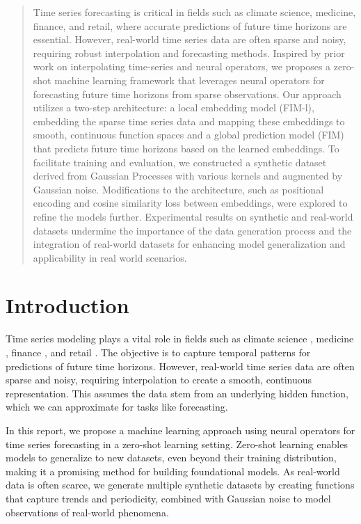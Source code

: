 \documentclass{article}
\theoremstyle{plain}
\theoremstyle{definition}
\theoremstyle{remark}
\begin{document}
\begin{abstract}
Time series forecasting is critical in fields such as climate science, medicine, finance, and retail, where accurate predictions of future time horizons are essential.
However, real-world time series data are often sparse and noisy, requiring robust interpolation and forecasting methods.
Inspired by prior work on interpolating time-series and neural operators, we proposes a zero-shot machine learning framework that leverages neural operators for forecasting future time horizons from sparse observations.
Our approach utilizes a two-step architecture: a local embedding model (FIM-l), embedding the sparse time series data and mapping these embeddings to smooth, continuous function spaces
and a global prediction model (FIM) that predicts future time horizons based on the learned embeddings.
To facilitate training and evaluation, we constructed a synthetic dataset derived from Gaussian Processes with various kernels and augmented by Gaussian noise.
Modifications to the architecture, such as positional encoding and cosine similarity loss between embeddings, were explored to refine the models further.
Experimental results on synthetic and real-world datasets undermine the importance of the data generation process and the integration of real-world datasets for enhancing model generalization and applicability in real world scenarios.
\end{abstract}

\section{Introduction}

Time series modeling plays a vital role in fields such as climate science \cite{climate}, medicine \cite{medicine}, finance \cite{finance}, and retail \cite{retail}. The objective is to capture temporal patterns for predictions of future time horizons. However, real-world time series data are often sparse and noisy, requiring interpolation to create a smooth, continuous representation. This assumes the data stem from an underlying hidden function, which we can approximate for tasks like forecasting.

In this report, we propose a machine learning approach using neural operators for time series forecasting in a zero-shot learning setting.
Zero-shot learning enables models to generalize to new datasets, even beyond their training distribution, making it a promising method for building foundational models. 
As real-world data is often scarce, we generate multiple synthetic datasets by creating functions that capture trends and periodicity, combined with Gaussian noise to model observations of real-world phenomena.
\end{document}
